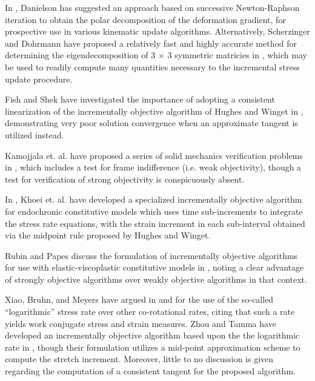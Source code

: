 In \cite{danielson2014}, Danielson has suggested an approach based on successive Newton-Raphson iteration to obtain the polar decomposition of the deformation gradient, for prospective use in various kinematic update algorithms. Alternatively, Scherzinger and Dohrmann have proposed a relatively fast and highly accurate method for determining the eigendecomposition of 3 $\times$ 3 symmetric matricies in \cite{scherzinger2008}, which may be used to readily compute many quantities necessary to the incremental stress update procedure.

Fish and Shek have investigated the importance of adopting a consistent linearization of the incrementally objective algorithm of Hughes and Winget in \cite{fish1999}, demonstrating very poor solution convergence when an approximate tangent is utilized instead.

Kamojjala et. al. have proposed a series of solid mechanics verification problems in \cite{kamojjala2015}, which includes a test for frame indifference (i.e. weak objectivity), though a test for verification of strong objectivity is conspicuously absent.

In \cite{Khoei2003}, Khoei et. al. have developed a specialized incrementally objective algorithm for endochronic constitutive models which uses time sub-increments to integrate the stress rate equations, with the strain increment in each sub-interval obtained via the midpoint rule proposed by Hughes and Winget.

Rubin and Papes discuss the formulation of incrementally objective algorithms for use with elastic-viscoplastic constitutive models in \cite{rubin2011}, noting a clear advantage of strongly objective algorithms over weakly objective algorithms in that context.

Xiao, Bruhn, and Meyers have argued in \cite{xiao1997} and \cite{xiao1998} for the use of the so-called ``logarithmic'' stress rate over other co-rotational rates, citing that such a rate yields work conjugate stress and strain measures. Zhou and Tamma have developed an incrementally objective algorithm based upon the the logarithmic rate in \cite{zhou2003}, though their formulation utilizes a mid-point approximation scheme to compute the stretch increment. Moreover, little to no discussion is given regarding the computation of a consistent tangent for the proposed algorithm.

